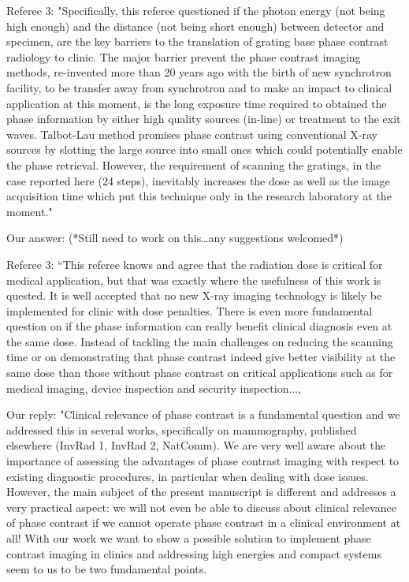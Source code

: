 \documentclass[a4paper,english]{scrartcl} \usepackage[detect-all]{siunitx}
\begin{document}
Referee 3: "Specifically, this referee questioned if the photon energy (not
being high enough) and the distance (not being short enough) between
detector and specimen, are the key barriers to the translation of grating
base phase contrast radiology to clinic. The major barrier prevent the phase
contrast imaging methods, re-invented more than 20 years ago with the birth
of new synchrotron facility, to be transfer away from synchrotron and to
make an impact to clinical application at this moment, is the long exposure
time required to obtained the phase information by either high quality
sources (in-line) or treatment to the exit waves. Talbot-Lau method promises
phase contrast using conventional X-ray sources by slotting the large source
into small ones which could potentially enable the phase retrieval. However,
the requirement of scanning the gratings, in the case reported here (24
steps), inevitably increases the dose as well as the image acquisition time
which put this technique only in the research laboratory at the moment." 

Our answer: (*Still need to work on this…any suggestions welcomed*)

Referee 3: “This referee knows and agree that the radiation dose is critical
for medical application, but that was exactly where the usefulness of this
work is quested. It is well accepted that no new X-ray imaging technology is
likely be implemented for clinic with dose penalties. There is even more
fundamental question on if the phase information can really benefit clinical
diagnosis even at the same dose. Instead of tackling the main challenges on
reducing the scanning time or on demonstrating that phase contrast indeed
give better visibility at the same dose than those without phase contrast on
critical applications such as for medical imaging, device inspection and
security inspection..., 

Our reply: "Clinical relevance of phase contrast is a fundamental question
and we addressed this in several works, specifically on mammography,
published elsewhere (InvRad 1, InvRad 2, NatComm). We are very well aware
about the importance of assessing the advantages of phase contrast imaging
with respect to existing diagnostic procedures, in particular when dealing
with dose issues. However, the main subject of the present manuscript is
different and addresses a very practical aspect: we will not even be able to
discuss about clinical relevance of phase contrast if we cannot operate
phase contrast in a clinical environment at all! With our work we want to
show a possible solution to implement phase contrast imaging in clinics and
addressing high energies and compact systems seem to us to be two
fundamental points. 
\end{document}
